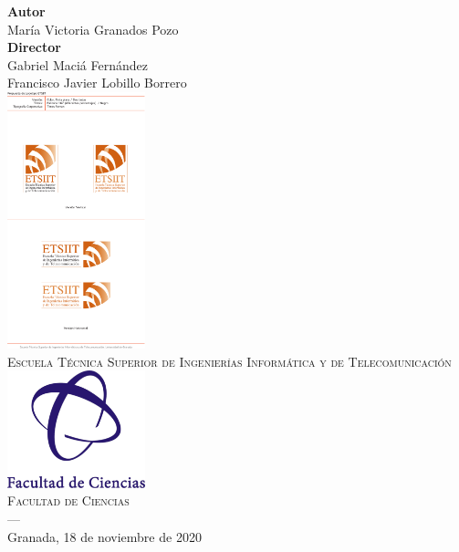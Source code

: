 \begin{titlepage}
\vspace{2.5cm}
\noindent\hspace*{\centeroffset}\begin{minipage}{\textwidth}
\centering

\textbf{Autor}\\ {María Victoria Granados Pozo}\\[2.5ex]
\textbf{Director}\\
{Gabriel Maciá Fernández\\
Francisco Javier Lobillo Borrero 
}\\[2cm]
\includegraphics[width=0.3\textwidth]{portada/imagenes/logoEtsiit.pdf}\\[0.1cm]
\textsc{Escuela Técnica Superior de Ingenierías Informática y de Telecomunicación}\\
\includegraphics[width=0.3\textwidth]{portada/imagenes/logoCiencias.png}\\[0.1cm]
\textsc{Facultad de Ciencias}\\

\textsc{---}\\
Granada, 18 de noviembre de 2020
\end{minipage}
\end{titlepage}



